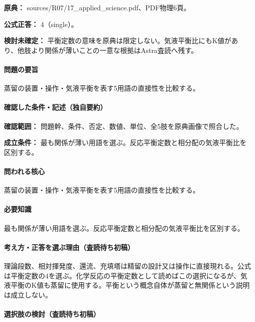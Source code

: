 \noindent\textbf{原典：} sources/R07/17\_applied\_science.pdf、PDF物理6頁。

\textbf{公式正答：} 4（single）。

\par\textbf{検討未確定：} 平衡定数の意味を原典は限定しない。気液平衡比にもK値があり、他肢より関係が薄いことの一意な根拠はAstra査読へ残す。

\paragraph{問題の要旨} 蒸留の装置・操作・気液平衡を表す5用語の直接性を比較する。

\paragraph{確認した条件・記述（独自要約）}\mbox{}\par

\noindent\textbf{確認範囲：} 問題幹、条件、否定、数値、単位、全5肢を原典画像で照合した。\par

\noindent\textbf{成立条件：} 最も関係が薄い用語を選ぶ。反応平衡定数と相分配の気液平衡比を区別する。\par

\paragraph{問われる核心} 蒸留の装置・操作・気液平衡を表す5用語の直接性を比較する。

\paragraph{必要知識} 最も関係が薄い用語を選ぶ。反応平衡定数と相分配の気液平衡比を区別する。

\paragraph{考え方・正答を選ぶ理由（査読待ち初稿）} 理論段数、相対揮発度、還流、充填塔は精留の設計又は操作に直接現れる。公式は平衡定数の4を選ぶ。化学反応の平衡定数として読めばこの選択になるが、気液平衡のK値も蒸留に使用する。平衡という概念自体が蒸留と無関係という説明は成立しない。

\paragraph{選択肢の検討（査読待ち初稿）}\mbox{}\par

